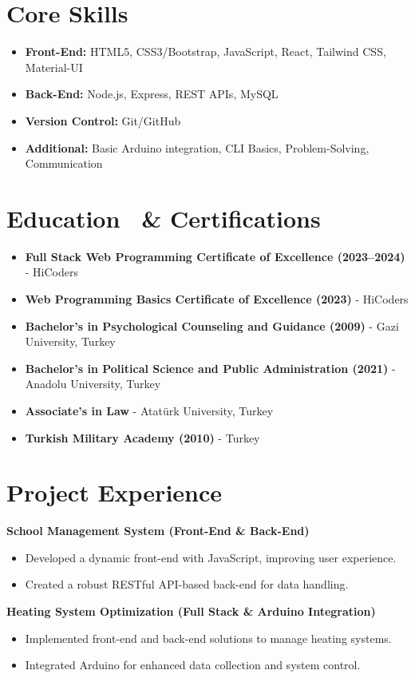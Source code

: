 \documentclass[a4paper,10pt]{article}
\begin{document}
\section*{Core Skills}
\begin{itemize}
    \item \textbf{Front-End:} HTML5, CSS3/Bootstrap, JavaScript, React, Tailwind CSS, Material-UI
    \item \textbf{Back-End:} Node.js, Express, REST APIs, MySQL
    \item \textbf{Version Control:} Git/GitHub
    \item \textbf{Additional:} Basic Arduino integration, CLI Basics, Problem-Solving, Communication
\end{itemize}

\section*{Education \ \& Certifications}
\begin{itemize}
    \item \textbf{Full Stack Web Programming Certificate of Excellence (2023–2024)} - HiCoders
    \item \textbf{Web Programming Basics Certificate of Excellence (2023)} - HiCoders
    \item \textbf{Bachelor’s in Psychological Counseling and Guidance (2009)} - Gazi University, Turkey
    \item \textbf{Bachelor’s in Political Science and Public Administration (2021)} - Anadolu University, Turkey
    \item \textbf{Associate’s in Law} - Atatürk University, Turkey
    \item \textbf{Turkish Military Academy (2010)} -  Turkey
\end{itemize}

\newpage

\section*{Project Experience}
\textbf{School Management System (Front-End \& Back-End)}
\begin{itemize}
    \item Developed a dynamic front-end with JavaScript, improving user experience.
    \item Created a robust RESTful API-based back-end for data handling.
\end{itemize}
\textbf{Heating System Optimization (Full Stack \& Arduino Integration)}
\begin{itemize}
    \item Implemented front-end and back-end solutions to manage heating systems.
    \item Integrated Arduino for enhanced data collection and system control.
\end{itemize}
\end{document}
